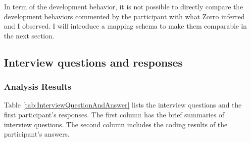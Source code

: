In term of the development behavior, it is not possible to directly
compare the development behaviors commented by the participant with
what Zorro inferred and I observed. I will introduce a mapping schema
to make them comparable in the next section.

\subsection{Interview questions and responses}

\subsubsection{Analysis Results}

Table \ref{tab:InterviewQuestionAndAnswer} lists the interview questions 
and the first participant's responses. The first column has the brief 
summaries of interview questions. The second column includes the coding 
results of the participant's answers.

